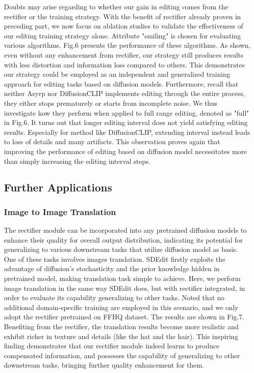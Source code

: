 \documentclass[letterpaper]{article} %
\begin{document}
Doubts may arise regarding to whether our gain in editing comes from the rectifier or the training strategy. With the benefit of rectifier already proven in preceding part, we now focus on ablation studies to validate the effectiveness of our editing training strategy alone. Attribute "smiling" is chosen for evaluating various algorithms.  Fig.6 presents the performance of these algorithms. As shown, even without any enhancement from rectifier, our strategy still produces results with less distortion and information loss compared to others. This demonstrates our strategy could be employed as an independent and generalized training approach for editing tasks based on diffusion models. Furthermore, recall that neither Asyrp nor DiffusionCLIP implements editing through the entire process, they either stops prematurely or starts from incomplete noise. We thus investigate how they perform when applied to full range editing, denoted as "full" in Fig.6. It turns out that longer editing interval does not yield satisfying editing results. Especially for method like DiffusionCLIP, extending interval instead leads to loss of details and many artifacts. This observation proves again that improving the performance of editing based on diffusion model necessitates more than simply increasing the editing interval steps.

\subsection{Further Applications}

\subsubsection{Image to Image Translation}
The rectifier module can be incorporated into any pretrained diffusion models to enhance their quality for overall output distribution, indicating its potential for generalizing to various downstream tasks that utilize diffusion model as basis. One of these tasks involves images translation. SDEdit \cite{meng2021sdedit} firstly exploits the advantage of diffusion's stochasticity and the prior knowledge hidden in pretrained model, making translation task simple to achieve. Here, we perform image translation in the same way SDEdit does, but with rectifier integrated, in order to evaluate its capability generalizing to other tasks. Noted that no additional domain-specific training are employed in this scenario, and we only adopt the rectifier pretrained on FFHQ dataset. The results are shown in Fig.7. Benefiting from the rectifier, the translation results become more realistic and exhibit richer in texture and details (like the hat and the hair). This inspiring finding demonstrates that our rectifier module indeed learns to produce compensated information, and possesses the capability of generalizing to other downstream tasks, bringing further quality enhancement for them.
\end{document}
